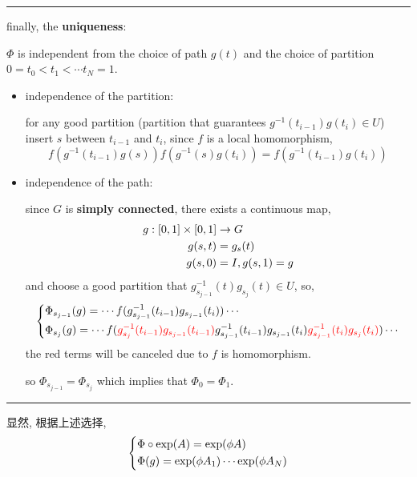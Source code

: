 \begin{itemize}
\begin{tcolorbox}[title=proof:]
		\noindent\rule[0.5ex]{\linewidth}{0.5pt} %
		
		finally, the \textbf{uniqueness}:
		
		$\Phi$ is independent from the choice of path $g(t)$ and the choice of partition $0 = t_0 < t_1 < \cdots t_N = 1$.
		\begin{itemize}
			\item independence of the partition:
			
			for any good partition (partition that guarantees $g^{- 1}(t_{i - 1}) g(t_i) \in U$) insert $s$ between $t_{i - 1}$ and $t_i$, since $f$ is a local homomorphism,
			\begin{equation}
				f(g^{- 1}(t_{i - 1}) g(s)) f(g^{- 1}(s) g(t_i)) = f(g^{- 1}(t_{i - 1}) g(t_i))
			\end{equation}
			
			\item independence of the path:
			
			since $G$ is \textbf{simply connected}, there exists a continuous map,
			\begin{align}
				g : [0, 1] \times [0, 1] & \rightarrow G \notag \\
				g(s, t) &= g_s(t) \notag \\
				g(s, 0) &= I, g(s, 1) = g
			\end{align}
			and choose a good partition that $g_{s_{j - 1}}^{- 1}(t) g_{s_j}(t) \in U$, so,
			\begin{equation}
				\begin{dcases}
					\Phi_{s_{j - 1}}(g) = \cdots f(g_{s_{j - 1}}^{- 1}(t_{i - 1}) g_{s_{j - 1}}(t_i)) \cdots \\
					\Phi_{s_j}(g) = \cdots f(\mathcolor{red}{g_{s_j}^{- 1}(t_{i - 1}) g_{s_{j - 1}}(t_{i - 1})} g_{s_{j - 1}}^{- 1}(t_{i - 1}) g_{s_{j - 1}}(t_i) \mathcolor{red}{g_{s_{j - 1}}^{- 1}(t_i) g_{s_j}(t_i)}) \cdots
				\end{dcases}
			\end{equation}
			the red terms will be canceled due to $f$ is homomorphism.
			
			so $\Phi_{s_{j - 1}} = \Phi_{s_j}$ which implies that $\Phi_0 = \Phi_1$.
		\end{itemize}
		
		\noindent\rule[0.5ex]{\linewidth}{0.5pt} %
		
		显然, 根据上述选择,
		\begin{equation}
			\begin{dcases}
				\Phi \circ \exp(A) = \exp(\phi A) \\
				\Phi(g) = \exp(\phi A_1) \cdots \exp(\phi A_N)
			\end{dcases}
		\end{equation}
		

\end{tcolorbox}
\end{itemize}
